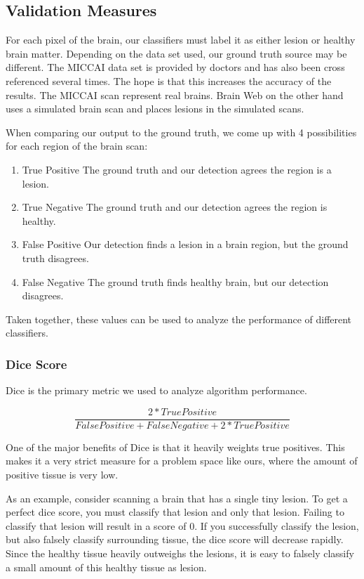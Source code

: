 \documentclass{article} %
\begin{document}
\subsection{Validation Measures}
For each pixel of the brain, our classifiers must label it as either lesion or healthy brain matter. Depending on the data set used, our ground truth source may be different. The MICCAI data set is provided by doctors and has also been cross referenced several times. The hope is that this increases the accuracy of the results. The MICCAI scan represent real brains. Brain Web on the other hand uses a simulated brain scan and places lesions in the simulated scans.

When comparing our output to the ground truth, we come up with 4 possibilities for each region of the brain scan:
\begin{enumerate}
  \item True Positive \newline
		The ground truth and our detection agrees the region is a lesion.
  \item True Negative \newline
  		The ground truth and our detection agrees the region is healthy.
  \item False Positive \newline
  		Our detection finds a lesion in a brain region, but the ground truth disagrees.
  \item False Negative \newline
  		The ground truth finds healthy brain, but our detection disagrees.
\end{enumerate} 
Taken together, these values can be used to analyze the performance of different classifiers. 
\subsubsection{Dice Score}
Dice is the primary metric we used to analyze algorithm performance. 

$$\frac{2*True Positive}{False Positive + False Negative + 2*True Positive}$$

One of the major benefits of Dice is that it heavily weights true positives. This makes it a very strict measure for a problem space like ours, where the amount of positive tissue is very low. 

As an example, consider scanning a brain that has a single tiny lesion. To get a perfect dice score, you must classify that lesion and only that lesion. Failing to classify that lesion will result in a score of 0. If you successfully classify the lesion, but also falsely classify surrounding tissue, the dice score will decrease rapidly. Since the healthy tissue heavily outweighs the lesions, it is easy to falsely classify a small amount of this healthy tissue as lesion.
\end{document}
